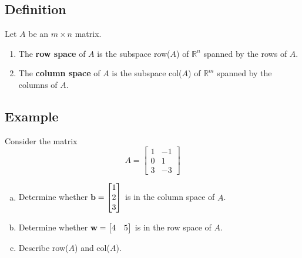\subsection*{Definition}
Let $A$ be an $m\times n$ matrix.
\begin{enumerate}
    \item The \textbf{row space} of $A$ is the subspace row($A$) of $\mathbb{R}^n$ spanned by the rows of $A$.
    \item The \textbf{column space} of $A$ is the subspace col($A$) of $\mathbb{R}^m$ spanned by the columns of $A$.
\end{enumerate}

\subsection*{Example}
Consider the matrix \[A=\begin{bmatrix}
        1 & -1 \\
        0 & 1  \\
        3 & -3
    \end{bmatrix}\]
\begin{enumerate}[(a)]
    \item Determine whether $\mathbf{b}=\begin{bmatrix}
                  1 \\2\\3
              \end{bmatrix}$ is in the column space of $A$.
    \item Determine whether $\mathbf{w}=\begin{bmatrix}
                  4 & 5
              \end{bmatrix}$ is in the row space of $A$.
    \item Describe row($A$) and col($A$).
\end{enumerate}

